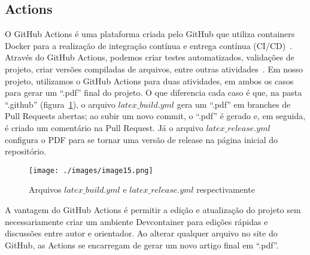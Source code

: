 \subsection{Actions}

O GitHub Actions é uma plataforma criada pelo GitHub que utiliza containers Docker para a realização de integração contínua e entrega contínua (CI/CD)~\cite{github:02}. Através do GitHub Actions, podemos criar testes automatizados, validações de projeto, criar versões compiladas de arquivos, entre outras atividades~\cite{github:02}. Em nosso projeto, utilizamos o GitHub Actions para duas atividades, em ambos os casos para gerar um ``.pdf'' final do projeto. O que diferencia cada caso é que, na pasta ``.github'' (figura~\ref{fig:image15}), o arquivo $latex\_build.yml$  gera um ``.pdf'' em branches de Pull Requests abertas; ao subir um novo commit, o ``.pdf'' é gerado e, em seguida, é criado um comentário na Pull Request. Já o arquivo $latex\_release.yml$ configura o PDF para se tornar uma versão de release na página inicial do repositório.

\begin{figure}[ht]
	\centering
	\texttt{[image: ./images/image15.png]}
	\caption{Arquivos $latex\_build.yml$ e $latex\_release.yml$ respectivamente}
	\label{fig:image15}
\end{figure}

A vantagem do GitHub Actions é permitir a edição e atualização do projeto sem necessariamente criar um ambiente Devcontainer para edições rápidas e discussões entre autor e orientador. Ao alterar qualquer arquivo no site do GitHub, as Actions se encarregam de gerar um novo artigo final em  ``.pdf''.